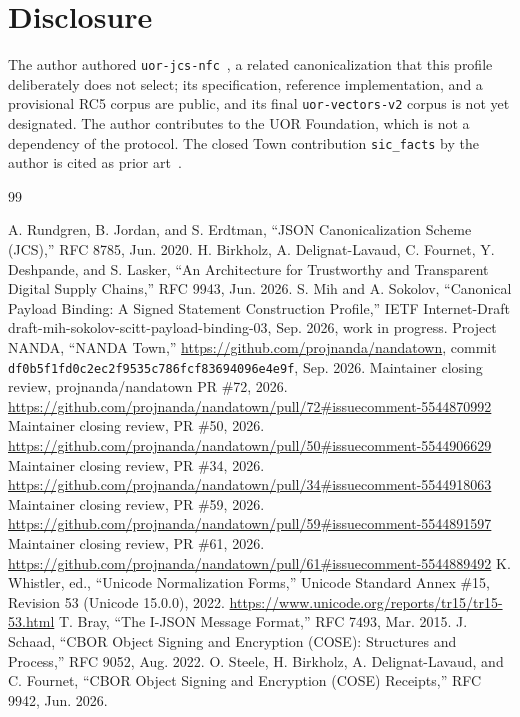 \documentclass[conference]{IEEEtran}
\begin{document}
\section*{Disclosure}
The author authored \texttt{uor-jcs-nfc}~\cite{uorjcsnfc}, a related canonicalization that this profile deliberately does not select; its specification, reference implementation, and a provisional RC5 corpus are public, and its final \texttt{uor-vectors-v2} corpus is not yet designated. The author contributes to the UOR Foundation, which is not a dependency of the protocol. The closed Town contribution \texttt{sic\_facts} by the author is cited as prior art~\cite{sicfacts}.

\begin{thebibliography}{99}\footnotesize\raggedright
{} A. Rundgren, B. Jordan, and S. Erdtman, ``JSON Canonicalization Scheme (JCS),'' RFC 8785, Jun. 2020.
 H. Birkholz, A. Delignat-Lavaud, C. Fournet, Y. Deshpande, and S. Lasker, ``An Architecture for Trustworthy and Transparent Digital Supply Chains,'' RFC 9943, Jun. 2026.
 S. Mih and A. Sokolov, ``Canonical Payload Binding: A Signed Statement Construction Profile,'' IETF Internet-Draft draft-mih-sokolov-scitt-payload-binding-03, Sep. 2026, work in progress.
 Project NANDA, ``NANDA Town,'' \url{https://github.com/projnanda/nandatown}, commit \texttt{df0b5f1fd0c2ec2f9535c786fcf83694096e4e9f}, Sep. 2026.
 Maintainer closing review, projnanda/nandatown PR \#72, 2026. \url{https://github.com/projnanda/nandatown/pull/72\#issuecomment-5544870992}
 Maintainer closing review, PR \#50, 2026. \url{https://github.com/projnanda/nandatown/pull/50\#issuecomment-5544906629}
 Maintainer closing review, PR \#34, 2026. \url{https://github.com/projnanda/nandatown/pull/34\#issuecomment-5544918063}
 Maintainer closing review, PR \#59, 2026. \url{https://github.com/projnanda/nandatown/pull/59\#issuecomment-5544891597}
 Maintainer closing review, PR \#61, 2026. \url{https://github.com/projnanda/nandatown/pull/61\#issuecomment-5544889492}
 K. Whistler, ed., ``Unicode Normalization Forms,'' Unicode Standard Annex \#15, Revision 53 (Unicode 15.0.0), 2022. \url{https://www.unicode.org/reports/tr15/tr15-53.html}
 T. Bray, ``The I-JSON Message Format,'' RFC 7493, Mar. 2015.
 J. Schaad, ``CBOR Object Signing and Encryption (COSE): Structures and Process,'' RFC 9052, Aug. 2022.
 O. Steele, H. Birkholz, A. Delignat-Lavaud, and C. Fournet, ``CBOR Object Signing and Encryption (COSE) Receipts,'' RFC 9942, Jun. 2026.

\end{thebibliography}
\end{document}
